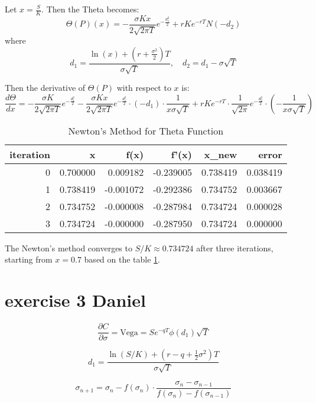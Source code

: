\documentclass{article}
\begin{document}
Let \( x = \frac{S}{K} \). Then the Theta becomes:
\[
    \Theta(P)(x) = -\frac{\sigma K x}{2\sqrt{2\pi T}} e^{-\frac{d_1^2}{2}} + rK e^{-rT} N(-d_2)
\]
where
\[
    d_1 = \frac{\ln(x) + \left(r + \frac{\sigma^2}{2} \right)T}{\sigma\sqrt{T}}, \quad d_2 = d_1 - \sigma\sqrt{T}
\]

Then the derivative of \( \Theta(P) \) with respect to \( x \) is:
\[
    \frac{d\Theta}{dx} = -\frac{\sigma K}{2\sqrt{2\pi T}} e^{-\frac{d_1^2}{2}}
    - \frac{\sigma K x}{2\sqrt{2\pi T}} e^{-\frac{d_1^2}{2}} \cdot (-d_1) \cdot \frac{1}{x \sigma \sqrt{T}}
    + rK e^{-rT} \cdot \frac{1}{\sqrt{2\pi}} e^{-\frac{d_2^2}{2}} \cdot \left(-\frac{1}{x \sigma \sqrt{T}} \right)
\]

\begin{table}
    \centering
    \caption{Newton's Method for Theta Function}
    \label{tab:newton_theta}
    \begin{tabular}{rrrrrr}
        \toprule
        iteration & x        & f(x)      & f'(x)     & x\_new   & error    \\
        \midrule
        0         & 0.700000 & 0.009182  & -0.239005 & 0.738419 & 0.038419 \\
        1         & 0.738419 & -0.001072 & -0.292386 & 0.734752 & 0.003667 \\
        2         & 0.734752 & -0.000008 & -0.287984 & 0.734724 & 0.000028 \\
        3         & 0.734724 & -0.000000 & -0.287950 & 0.734724 & 0.000000 \\
        \bottomrule
    \end{tabular}
\end{table}

The Newton's method converges to \( S/K \approx 0.734724 \) after three iterations,
starting from \( x = 0.7 \) based on the table \ref{tab:newton_theta}.

\section{exercise 3 Daniel}
\[
    \frac{\partial C}{\partial \sigma} = \text{Vega} = S e^{-qT} \phi(d_1) \sqrt{T}
\]

\[
    d_1 = \frac{\ln(S/K) + (r - q + \frac{1}{2} \sigma^2)T}{\sigma \sqrt{T}}
\]

\[
    \sigma_{n+1} = \sigma_n - f(\sigma_n) \cdot \frac{\sigma_n - \sigma_{n-1}}{f(\sigma_n) - f(\sigma_{n-1})}
\]
\end{document}
